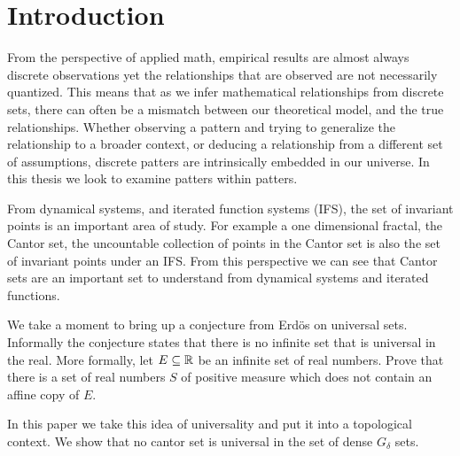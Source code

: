 \chapter{Introduction}

From the perspective of applied math, empirical results are almost always discrete observations yet the relationships that are observed are not necessarily quantized.  This means that as we infer mathematical relationships from discrete sets, there can often be a mismatch between our theoretical model, and the true relationships.  %
Whether observing a pattern and trying to generalize the relationship to a broader context, or deducing a relationship from a different set of assumptions, discrete patters are intrinsically embedded in our universe. In this thesis we look to examine patters within patters.  

From dynamical systems, and iterated function systems (IFS), the set of invariant points is an important area of study.  For example a one dimensional fractal, the Cantor set, the uncountable collection of points in the Cantor set is also the set of invariant points under an IFS.  From this perspective we can see that Cantor sets are an important set to understand from dynamical systems and iterated functions.  

We take a moment to bring up a conjecture from Erd\"{o}s on universal sets. Informally the conjecture states that there is no infinite set that is universal in the real. More formally, let $E\subseteq \mathbb{R}$ be an infinite set of real numbers.  Prove that there is a set of real numbers $S$ of positive measure which does not contain an affine copy of $E$.  

In this paper we take this idea of universality and put it into a topological context.  We show that no cantor set is universal in the set of dense $G_\delta$ sets.  



